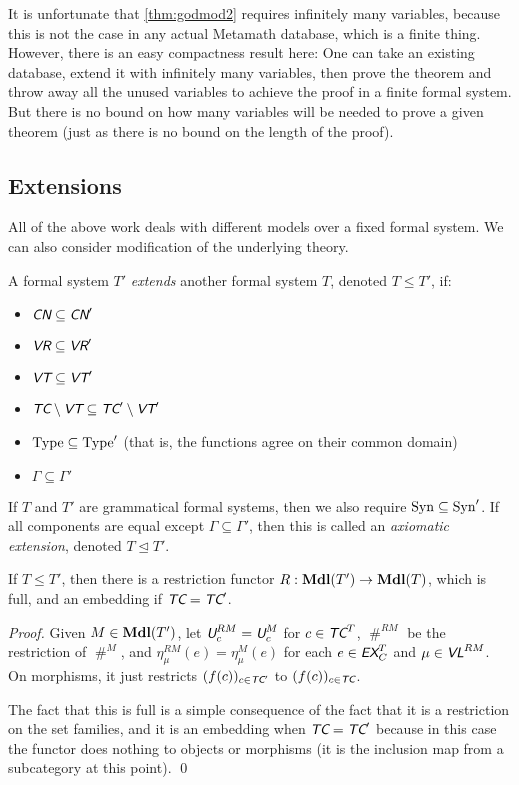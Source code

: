 \documentclass[runningheads,a4paper]{llncs}
\newcommand{\cn}{\textit{\textsf{CN}}} %
\newcommand{\vr}{\textit{\textsf{VR}}} %
\newcommand{\ec}{\textit{\textsf{EX}}_C} %
\newcommand{\tc}{\textit{\textsf{TC}}} %
\newcommand{\vt}{\textit{\textsf{VT}}} %
\newcommand{\vl}{\textit{\textsf{VL}}} %
\newcommand{\uv}{\textit{\textsf{U}}} %
\newcommand{\type}{{\rm Type}}
\newcommand{\syn}{{\rm Syn}}
\newcommand{\fresh}{\mathbin{\#}}
\begin{document}
\begin{remark}\label{rem:modcls}
It is unfortunate that \autoref{thm:godmod2} requires infinitely many variables, because this is not the case in any actual Metamath database, which is a finite thing. However, there is an easy compactness result here: One can take an existing database, extend it with infinitely many variables, then prove the theorem and throw away all the unused variables to achieve the proof in a finite formal system. But there is no bound on how many variables will be needed to prove a given theorem (just as there is no bound on the length of the proof).
\end{remark}                                              

\subsection{Extensions}\label{sec:extension}
All of the above work deals with different models over a fixed formal system. We can also consider modification of the underlying theory.

\begin{definition}
A formal system $T'$ {\em extends} another formal system $T$, denoted $T\le T'$, if:
\begin{itemize}
  \item $\cn\subseteq\cn'$
  \item $\vr\subseteq\vr'$
  \item $\vt\subseteq\vt'$
  \item $\tc\setminus\vt\subseteq\tc'\setminus\vt'$
  \item $\type\subseteq\type'$ (that is, the functions agree on their common domain)
  \item $\Gamma\subseteq\Gamma'$
\end{itemize}
If $T$ and $T'$ are grammatical formal systems, then we also require $\syn\subseteq\syn'$. If all components are equal except $\Gamma\subseteq\Gamma'$, then this is called an {\em axiomatic extension}, denoted $T\unlhd T'$.
\end{definition}

\begin{theorem}\label{sec:resfunc}
If $T\le T'$, then there is a restriction functor $R:{\bf Mdl}(T')\to{\bf Mdl}(T)$, which is full, and an embedding if $\tc=\tc'$.
\end{theorem}
\begin{proof}
Given $M\in{\bf Mdl}(T')$, let $\uv^{RM}_c=\uv^M_c$ for $c\in\tc^T$, $\fresh^{RM}$ be the restriction of $\fresh^M$, and $\eta^{RM}_\mu(e)=\eta^M_\mu(e)$ for each $e\in\ec^T$ and $\mu\in\vl^{RM}$. On morphisms, it just restricts $(f(c))_{c\in\tc'}$ to $(f(c))_{c\in\tc}$. 

The fact that this is full is a simple consequence of the fact that it is a restriction on the set families, and it is an embedding when $\tc=\tc'$ because in this case the functor does nothing to objects or morphisms (it is the inclusion map from a subcategory at this point).
\qed\end{proof}
\end{document}
